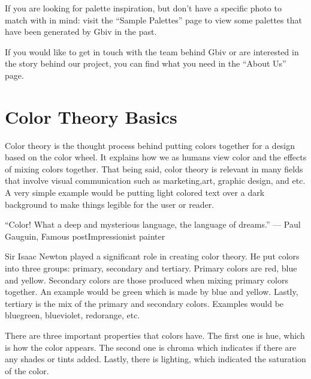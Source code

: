 \documentclass[letterpaper,10pt,english,openany,oneside]{sphinxmanual}
\begin{document}
\sphinxAtStartPar
If you are looking for palette inspiration, but don’t have a specific photo to match with in mind: visit the “Sample Palettes” page to view some palettes that have been generated by Gbiv in the past.

\sphinxAtStartPar
If you would like to get in touch with the team behind Gbiv or are interested in the story behind our project, you can find what you need in the “About Us” page.

\sphinxstepscope


\chapter{Color Theory Basics}
\label{\detokenize{color_theory:color-theory-basics}}\label{\detokenize{color_theory:color-theory}}\label{\detokenize{color_theory::doc}}
\sphinxAtStartPar
{}

\sphinxAtStartPar
Color theory is the thought process behind putting colors together for a design based on the color wheel. It explains how we as humans view color and the effects of mixing colors together. That being said, color theory is relevant in many fields that involve visual communication such as marketing,art, graphic design, and etc. A very simple example would be putting light colored text over a dark background to make things legible for the user or reader.

\sphinxAtStartPar
“Color! What a deep and mysterious language, the language of dreams.”
— Paul Gauguin, Famous post\sphinxhyphen{}Impressionist painter

\sphinxAtStartPar
{}

\sphinxAtStartPar
Sir Isaac Newton played a significant role in creating color theory. He put colors into three groups: primary, secondary and tertiary. Primary colors are red, blue and yellow. Secondary colors are those produced when mixing primary colors together. An example would be green which is made by blue and yellow. Lastly, tertiary is the mix of the primary and secondary colors. Examples would be blue\sphinxhyphen{}green, blue\sphinxhyphen{}violet, red\sphinxhyphen{}orange, etc.

\sphinxAtStartPar
{}

\sphinxAtStartPar
There are three important properties that colors have. The first one is hue, which is how the color appears. The second one is chroma which indicates if there are any shades or tints added. Lastly, there is lighting, which indicated the saturation of the color.
\end{document}
